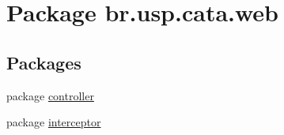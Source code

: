 \hypertarget{namespacebr_1_1usp_1_1cata_1_1web}{\section{Package br.\+usp.\+cata.\+web}
\label{namespacebr_1_1usp_1_1cata_1_1web}
}
\subsection*{Packages}
\begin{DoxyCompactItemize}
\item 
package \hyperlink{namespacebr_1_1usp_1_1cata_1_1web_1_1controller}{controller}
\item 
package \hyperlink{namespacebr_1_1usp_1_1cata_1_1web_1_1interceptor}{interceptor}
\end{DoxyCompactItemize}
